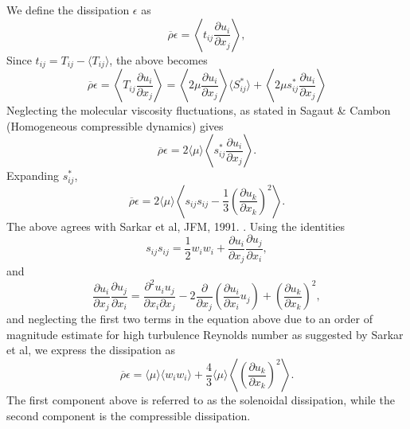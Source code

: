 \documentclass[oneside,a4paper,11pt]{report}
\newcommand{\rhoavg}{\overline{\rho}}
\newcommand{\uifluc}{u_i}
\newcommand{\ujfluc}{u_j}
\newcommand{\ukfluc}{u_k}
\begin{document}
We define the dissipation $\epsilon$ as
\begin{equation}
\rhoavg \epsilon = \left <  t_{ij} \frac{ \partial \uifluc }{\partial x_j } \right > ,
\end{equation}
Since $t_{ij} = T_{ij} - \langle T_{ij} \rangle$, the above becomes
\begin{equation}
    \rhoavg \epsilon = \left < T_{ij} \frac{\partial \uifluc}{\partial x_j} \right > = \left < 2 \mu \frac{\partial u_i}{\partial x_j} \right > \langle S^*_{ij} \rangle + \left < 2 \mu s^*_{ij} \frac{\partial u_i}{\partial x_j} \right >
\end{equation}
Neglecting the molecular viscosity fluctuations, as stated in Sagaut \& Cambon (Homogeneous compressible dynamics) gives
\begin{equation}
    \rhoavg \epsilon = 2 \langle \mu \rangle \left < s^*_{ij} \frac{\partial u_i}{\partial x_j} \right >.
\end{equation}
Expanding $s^*_{ij}$,
\begin{equation}
    \rhoavg \epsilon = 2 \langle \mu \rangle \left < s_{ij} s_{ij} - \frac{1}{3} \left ( \frac{ \partial \ukfluc }{ \partial x_k } \right )^2 \right >.
\end{equation}
The above agrees with Sarkar et al, JFM, 1991. \cite{Sarkar1991}. Using the identities 
\begin{equation}
s_{ij} s_{ij} = \frac{1}{2} w_i w_i + \frac{ \partial u_i }{ \partial x_j } \frac{ \partial u_j }{ \partial x_i}, 
\end{equation}
and
\begin{equation}
\frac{ \partial \uifluc }{ \partial x_j } \frac{ \partial \ujfluc }{ \partial x_i } = \frac{ \partial^2 \uifluc \ujfluc }{ \partial x_i \partial x_j}  -2 \frac{ \partial }{ \partial x_j } \left ( \frac{ \partial \uifluc }{ \partial x_i } \ujfluc \right ) + \left ( \frac{ \partial \ukfluc }{ \partial x_k } \right )^2 ,
\end{equation}
and neglecting the first two terms in the equation above due to an order of magnitude estimate for high turbulence Reynolds number as suggested by Sarkar et al, we express the dissipation as
\begin{equation}
\rhoavg \epsilon = \langle \mu \rangle \langle w_i w_i \rangle + \frac{4}{3} \langle \mu \rangle \left < \left ( \frac{ \partial \ukfluc }{ \partial x_k } \right )^2 \right >.
\end{equation}
The first component above is referred to as the solenoidal dissipation, while the second component is the compressible dissipation.
\end{document}
